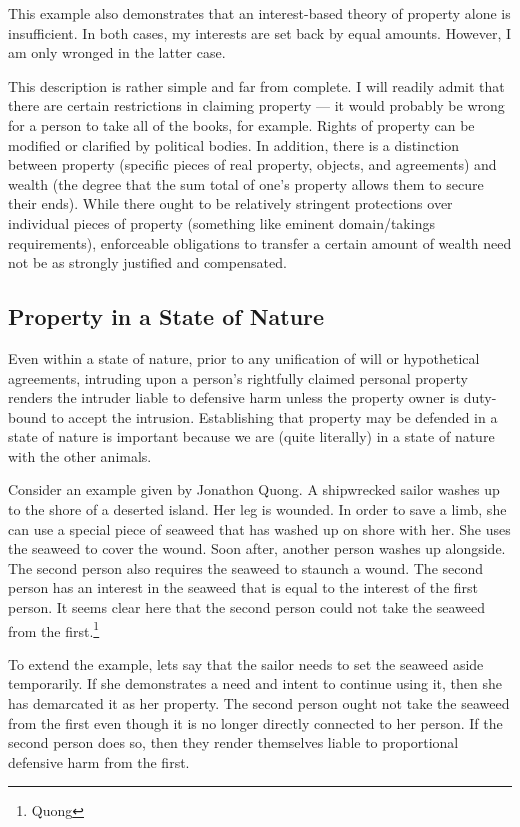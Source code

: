 	This example also demonstrates that an interest-based theory of property
	alone is insufficient. In both cases, my interests are set back by equal
	amounts. However, I am only wronged in the latter case.

	This description is rather simple and far from complete. I will readily
	admit that there are certain restrictions in claiming property --- it would
	probably be wrong for a person to take all of the books, for example. Rights
	of property can be modified or clarified by political bodies. In addition,
	there is a distinction between property (specific pieces of real property,
	objects, and agreements) and wealth (the degree that the sum total of one’s
	property allows them to secure their ends). While there ought to be
	relatively stringent protections over individual pieces of property
	(something like eminent domain/takings requirements), enforceable
	obligations to transfer a certain amount of wealth need not be as strongly
	justified and compensated.

	\subsection{Property in a State of Nature}

	Even within a state of nature, prior to any unification of will or
	hypothetical agreements, intruding upon a person’s rightfully claimed
	personal property renders the intruder liable to defensive harm unless the
	property owner is duty-bound to accept the intrusion.  Establishing that
	property may be defended in a state of nature is important because we are
	(quite literally) in a state of nature with the other animals. 

	Consider an example given by Jonathon Quong.  A shipwrecked sailor washes
	up to the shore of a deserted island. Her leg is wounded. In order to save
	a limb, she can use a special piece of seaweed that has washed up on shore
	with her. She uses the seaweed to cover the wound. Soon after, another
	person washes up alongside. The second person also requires the seaweed to
	staunch a wound. The second person has an interest in the seaweed that is
	equal to the interest of the first person. It seems clear here that the
	second person could not take the seaweed from the first.\footnote{Quong}

	To extend the example, lets say that the sailor needs to set the seaweed
	aside temporarily. If she demonstrates a need and intent to continue using
	it, then she has demarcated it as her property. The second person ought not
	take the seaweed from the first even though it is no longer directly
	connected to her person. If the second person does so, then they render
	themselves liable to proportional defensive harm from the first.

